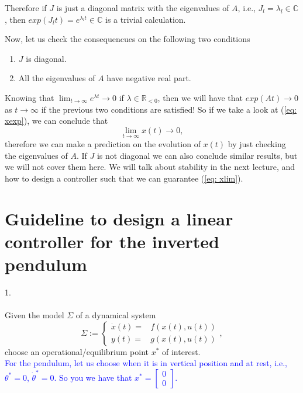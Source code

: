 Therefore if $J$ is just a diagonal matrix with the eigenvalues of $A$, i.e., $J_l = \lambda_l \in \mathbb{C}$, then $exp(J_lt) = e^{\lambda_lt} \in\mathbb{C}$ is a trivial calculation.

Now, let us check the consequencues on the following two conditions
\begin{enumerate}
	\item $J$ is diagonal.
	\item All the eigenvalues of $A$ have negative real part.
\end{enumerate}

Knowing that $\lim_{t\to\infty} e^{\lambda t} \to 0$ if $\lambda \in \mathbb{R}_{<0}$, then we will have that $exp(At) \to 0$ as $t\to\infty$ if the previous two conditions are satisfied! So if we take a look at (\ref{eq: xexp}), we can conclude that
\begin{equation}
	\lim_{t\to\infty} x(t) \to 0,
	\label{eq: xlim}
\end{equation}
therefore we can make a prediction on the evolution of $x(t)$ by just checking the eigenvalues of $A$. If $J$ is not diagonal we can also conclude similar results, but we will not cover them here. We will talk about stability in the next lecture, and how to design a controller such that we can guarantee (\ref{eq: xlim}).

\section{Guideline to design a linear controller for the inverted pendulum}
1. \\ \\
Given the model $\Sigma$ of a dynamical system
\begin{equation}
	\Sigma := \begin{cases}
		\dot x(t) =& f(x(t),u(t)) \\ y(t) =& g(x(t),u(t))
	\end{cases}, \nonumber
\end{equation}
choose an operational/equilibrium point $x^*$ of interest. \\

\textcolor{blue}{For the pendulum, let us choose when it is in vertical position and at rest, i.e., $\theta^* = 0$, $\dot\theta^* = 0$. So you we have that $x^* = \begin{bmatrix}0 \\ 0\end{bmatrix}$.} \\

